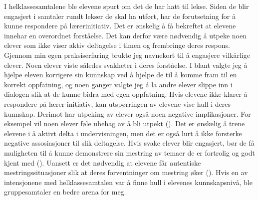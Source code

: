 \documentclass[12pt,twoside,onecolumn,norsk]{article}
\begin{document}
I helklassesamtalene ble elevene spurt om det de har hatt til lekse.
Siden de blir engasjert i samtaler rundt lekser de skal ha utført, har de forutsetning for å kunne 
respondere på lærerinitiativ. Det er ønskelig å få bekreftet at elevene innehar en overordnet 
forståelse. Det kan derfor være nødvendig å utpeke noen elever som ikke viser aktiv deltagelse i 
timen og frembringe deres respons. Gjennom min egen praksiserfaring brukte jeg navnekort
til å engasjere vilkårlige elever. Noen elever viste således svakheter i deres forståelse.
I blant valgte jeg å hjelpe eleven korrigere sin kunnskap ved å hjelpe de til å komme
fram til en korrekt oppfatning, og noen ganger valgte jeg å la andre elever slippe inn i dialogen
slik at de kunne bidra med egen oppfatning.
\newline
\newline
Hvis elevene ikke klarer å respondere på lærer initiativ, kan utspørringen av elevene vise hull 
i deres kunnskap. Derimot har utpeking av elever også noen negative implikasjoner. For eksempel 
vil noen elever føle ubehag av å bli utpekt (). Det er ønskelig å trene 
elevene i å aktivt delta i undervisningen, men det er også lurt å ikke forsterke negative 
assosiasjoner til slik deltagelse. Hvis svake elever blir engasjert, bør de få muligheten til å 
kunne demonstrere sin mestring av temaer de er fortrolig og godt kjent med (). 
Uansett er det nødvendig at elevene får autentiske mestringssituasjoner slik at deres forventninger
om mestring øker (). Hvis en av intensjonene med helklassesamtalen var å 
finne hull i elevenes kunnskapsnivå, ble gruppesamtaler en bedre arena for meg.
\end{document}
